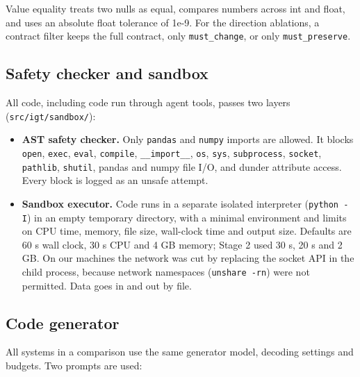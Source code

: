 \documentclass[11pt]{article}
\providecommand{\tightlist}{\setlength{\itemsep}{0pt}\setlength{\parskip}{0pt}}
\begin{document}
Value equality treats two nulls as equal, compares numbers across int
and float, and uses an absolute float tolerance of 1e-9. For the
direction ablations, a contract filter keeps the full contract, only
\texttt{must\_\allowbreak{}change}, or only
\texttt{must\_\allowbreak{}preserve}.

\subsection{Safety checker and sandbox}

All code, including code run through agent tools, passes two layers
(\texttt{src/\allowbreak{}igt/\allowbreak{}sandbox/\allowbreak{}}):

\begin{itemize}
\tightlist
\item
  \textbf{AST safety checker.} Only \texttt{pandas} and \texttt{numpy}
  imports are allowed. It blocks \texttt{open}, \texttt{exec},
  \texttt{eval}, \texttt{compile},
  \texttt{\_\allowbreak{}\_\allowbreak{}import\_\allowbreak{}\_\allowbreak{}},
  \texttt{os}, \texttt{sys}, \texttt{subprocess}, \texttt{socket},
  \texttt{pathlib}, \texttt{shutil}, pandas and numpy file I/O, and
  dunder attribute access. Every block is logged as an unsafe attempt.
\item
  \textbf{Sandbox executor.} Code runs in a separate isolated
  interpreter (\texttt{python -I}) in an empty temporary directory, with
  a minimal environment and limits on CPU time, memory, file size,
  wall-clock time and output size. Defaults are 60 s wall clock, 30 s
  CPU and 4 GB memory; Stage 2 used 30 s, 20 s and 2 GB. On our machines
  the network was cut by replacing the socket API in the child process,
  because network namespaces (\texttt{unshare -rn}) were not permitted.
  Data goes in and out by file.
\end{itemize}

\subsection{Code generator}

All systems in a comparison use the same generator model, decoding
settings and budgets. Two prompts are used:
\end{document}
